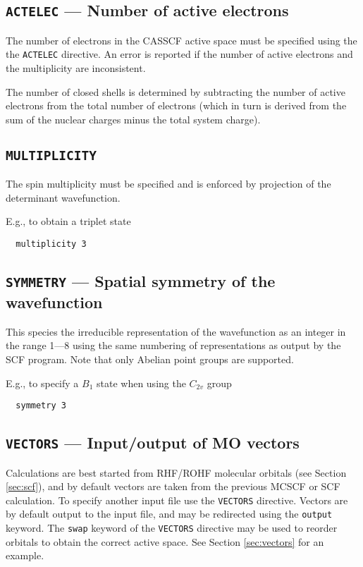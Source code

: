 \subsection{{\tt ACTELEC} --- Number of active electrons}

The number of electrons in the CASSCF active space must be specified
using the the {\tt ACTELEC} directive.  An error is reported if the
number of active electrons and the multiplicity are inconsistent.

The number of closed shells is determined by subtracting the number
of active electrons from the total number of electrons (which in turn
is derived from the sum of the nuclear charges minus the total system
charge).

\subsection{{\tt MULTIPLICITY}}

The spin multiplicity must be specified and is enforced by projection
of the determinant wavefunction.

E.g., to obtain a triplet state
\begin{verbatim}
  multiplicity 3
\end{verbatim}

\subsection{{\tt SYMMETRY} --- Spatial symmetry of the wavefunction}

This species the irreducible representation of the wavefunction as an
integer in the range 1---8 using the same numbering of representations
as output by the SCF program.  Note that only Abelian point groups are
supported.

E.g., to specify a $B_1$ state when using the $C_{2v}$ group
\begin{verbatim}
  symmetry 3
\end{verbatim}

\subsection{{\tt VECTORS} --- Input/output of MO vectors}
\label{sec:mcscfvectors}

Calculations are best started from RHF/ROHF molecular orbitals (see
Section \ref{sec:scf}), and by default vectors are taken from the
previous MCSCF or SCF calculation.  To specify another input file use
the \verb+VECTORS+ directive.  Vectors are by default output to the
input file, and may be redirected using the \verb+output+ keyword.
The \verb+swap+ keyword of the \verb+VECTORS+ directive may be
used to reorder orbitals to obtain the correct active space.
See Section \ref{sec:vectors} for an example.

